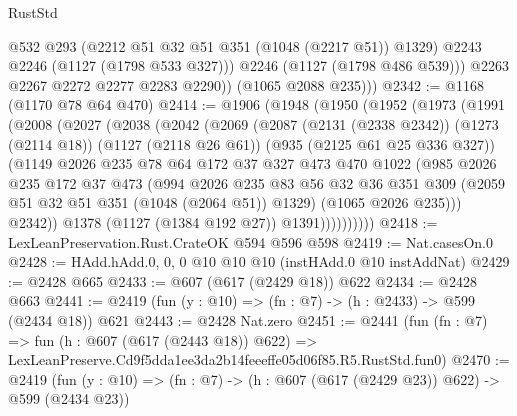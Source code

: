 \begin{lexlean}{RustStd}
\begin{coremodule}
                @532
                @293
                (@2212 @51 @32 @51 @351 (@1048 (@2217 @51)) @1329)
                @2243
                @2246
                (@1127 (@1798 @533 @327)))
              @2246
              (@1127 (@1798 @486 @539)))
            @2263
            @2267
            @2272
            @2277
            @2283
            @2290))
        (@1065 @2088 @235)))
@2342 := @1168 (@1170 @78 @64 @470)
@2414 := @1906
    (@1948
      (@1950
        (@1952
          (@1973
            (@1991
              (@2008
                (@2027
                  (@2038
                    (@2042
                      (@2069
                        (@2087
                          (@2131 (@2338 @2342))
                          (@1273 (@2114 @18))
                          (@1127 (@2118 @26 @61))
                          (@935 (@2125 @61 @25 @336 @327))
                          (@1149
                            @2026
                            @235
                            @78
                            @64
                            @172
                            @37
                            @327
                            @473
                            @470
                            @1022
                            (@985
                              @2026
                              @235
                              @172
                              @37
                              @473
                              (@994
                                @2026
                                @235
                                @83
                                @56
                                @32
                                @36
                                @351
                                @309
                                (@2059 @51 @32 @51 @351 (@1048 (@2064 @51)) @1329)
                                (@1065 @2026 @235)))
                            @2342))
                        @1378
                        (@1127 (@1384 @192 @27))
                        @1391))))))))))
@2418 := LexLeanPreservation.Rust.CrateOK @594 @596 @598
@2419 := Nat.casesOn.{0}
@2428 := HAdd.hAdd.{0, 0, 0} @10 @10 @10 (instHAdd.{0} @10 instAddNat)
@2429 := @2428 @665
@2433 := @607 (@617 (@2429 @18)) @622
@2434 := @2428 @663
@2441 := @2419 (fun (y : @10) => (fn : @7) -> (h : @2433) -> @599 (@2434 @18)) @621
@2443 := @2428 Nat.zero
@2451 := @2441
    (fun (fn : @7) =>
    fun (h : @607 (@617 (@2443 @18)) @622) =>
    LexLeanPreserve.Cd9f5dda1ee3da2b14feeeffe05d06f85.R5.RustStd.fun0)
@2470 := @2419
    (fun (y : @10) => (fn : @7) -> (h : @607 (@617 (@2429 @23)) @622) -> @599 (@2434 @23))

\end{coremodule}
\end{lexlean}
